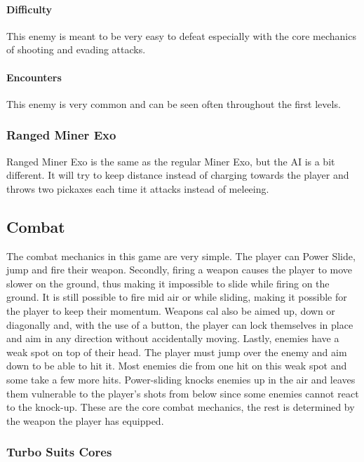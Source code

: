 \documentclass[12pt]{article}
\begin{document}
\paragraph{Difficulty}

This enemy is meant to be very easy to defeat especially with the core mechanics of shooting and evading attacks. 

\paragraph{Encounters}

This enemy is very common and can be seen often throughout the first levels.

\subsubsection{Ranged Miner Exo}

Ranged Miner Exo is the same as the regular Miner Exo, but the AI is a bit different. It will try to keep distance instead of charging towards the player and throws two pickaxes each time it attacks instead of meleeing. 

\subsection{Combat}

The combat mechanics in this game are very simple. The player can Power Slide, jump and fire their weapon. Secondly, firing a weapon causes the player to move slower on the ground, thus making it impossible to slide while firing on the ground. It is still possible to fire mid air or while sliding, making it possible for the player to keep their momentum. Weapons cal also be aimed up, down or diagonally and, with the use of a button, the player can lock themselves in place and aim in any direction without accidentally moving. Lastly, enemies have a weak spot on top of their head. The player must jump over the enemy and aim down to be able to hit it. Most enemies die from one hit on this weak spot and some take a few more hits. Power-sliding knocks enemies up in the air and leaves them vulnerable to the player's shots from below since some enemies cannot react to the knock-up.
These are the core combat mechanics, the rest is determined by the weapon the player has equipped.

\subsubsection{Turbo Suits Cores}
\end{document}
